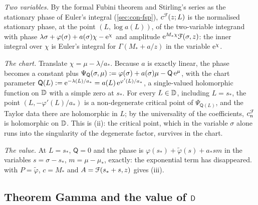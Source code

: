 \begin{sketch}
\emph{Two variables.} By the formal Fubini theorem and Stirling's series as the stationary phase of Euler's integral (\cref{sec:con-fsp}), $c^{\mathcal{F}}(z;L)$ is the normalised stationary phase, at the point $(L,\log a(L))$, of the two-variable integrand with phase $\lambda\sigma+\varphi(\sigma)+a(\sigma)\chi-\mathrm{e}^\chi$ and amplitude $\mathrm{e}^{M_*\chi}\mathcal{F}(\sigma,z)$: the inner integral over $\chi$ is Euler's integral for $\Gamma(M_*+a/z)$ in the variable $\mathrm{e}^\chi$.

\emph{The chart.} Translate $\chi=\mu-\lambda/a_*$. Because $a$ is exactly linear, the phase becomes a constant plus $\Psi_{\mathsf Q}(\sigma,\mu):=\varphi(\sigma)+a(\sigma)\mu-\mathsf Q\,\mathrm{e}^\mu$, with the chart parameter $\mathsf Q(L):=\mathrm{e}^{-\lambda(L)/a_*}=a(L)\,\mathrm{e}^{\varphi'(L)/a_*}$, a single-valued holomorphic function on $\mathbb{D}$ with a simple zero at $s_*$. For every $L\in\mathbb{D}$, including $L=s_*$, the point $(L,-\varphi'(L)/a_*)$ is a non-degenerate critical point of $\Psi_{\mathsf Q(L)}$, and the Taylor data there are holomorphic in $L$; by the universality of the coefficients, $c^{\mathcal{F}}_n$ is holomorphic on $\mathbb{D}$. This is (ii): the critical point, which in the variable $\sigma$ alone runs into the singularity of the degenerate factor, survives in the chart.

\emph{The value.} At $L=s_*$, $\mathsf Q=0$ and the phase is $\varphi(s_*)+\tilde\varphi(s)+a_*sm$ in the variables $s=\sigma-s_*$, $m=\mu-\mu_*$, exactly: the exponential term has disappeared.  with $P=\tilde\varphi$, $c=M_*$ and $A=\mathcal{F}(s_*+s,z)$ gives (iii).
\end{sketch}

\subsection{Theorem Gamma and the value of \texorpdfstring{$\mathsf{D}$}{D}}
\label{sec:gam-thm}

